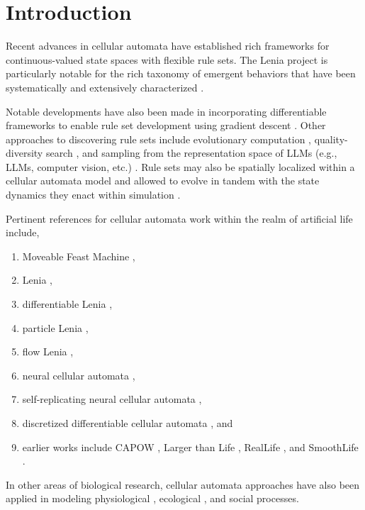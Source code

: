 \section{Introduction} \label{sec:introduction}

Recent advances in cellular automata have established rich frameworks for continuous-valued state spaces with flexible rule sets.
The Lenia project is particularly notable for the rich taxonomy of emergent behaviors that have been systematically and extensively characterized \citep{chan2020lenia,horibe2023exploring}.

Notable developments have also been made in incorporating differentiable frameworks to enable rule set development using gradient descent \citep{mordvintsev2020growing,hamon2022learning}.
Other approaches to discovering rule sets include evolutionary computation \citep{jain2024capturing}, quality-diversity search \citep{faldor2024toward}, and sampling from the representation space of LLMs (e.g., LLMs, computer vision, etc.) \citep{kumar2024automating}.
Rule sets may also be spatially localized within a cellular automata model and allowed to evolve in tandem with the state dynamics they enact within simulation \citep{plantec2023flowlenia}.

Pertinent references for cellular automata work within the realm of artificial life include,
\begin{enumerate}
\item Moveable Feast Machine \citep{ackley2023robust,ackley2019building,ackley2012movable},
\item Lenia \citep{chan2020lenia,chan2019lenia},
\item differentiable Lenia \citep{hamon2022learning},
\item particle Lenia \citep{mordvintsev2022particle},
\item flow Lenia \citep{plantec2023flowlenia},
\item neural cellular automata \citep{mordvintsev2020growing},
\item self-replicating neural cellular automata \citep{sinapayen2023selfreplication},
\item discretized differentiable cellular automata \citep{miotti2025differentiable}, and
\item earlier works include CAPOW \citep{griffeath2003new}, Larger than Life \citep{evans2001larger}, RealLife \citep{pivato2007reallife}, and SmoothLife \citep{rafler2011generalization}.
\end{enumerate}
In other areas of biological research, cellular automata approaches have also been applied in modeling physiological \citep{peak2004evidence,davidenko1992stationary}, ecological \citep{breckling2011cellular}, and social \citep{beltran2009forecasting} processes.

